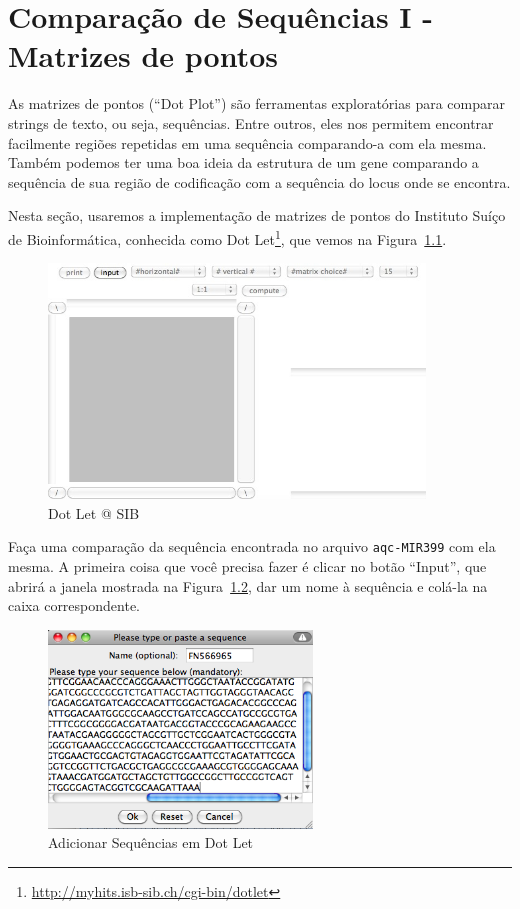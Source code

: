 \documentclass[letter,11pt]{book}
\begin{document}
\chapter{Comparação de Sequências I - Matrizes de pontos}

As matrizes de pontos (``Dot Plot'') são ferramentas exploratórias para comparar strings de texto, ou seja, sequências. Entre outros, eles nos permitem encontrar facilmente regiões repetidas em uma sequência comparando-a com ela mesma. Também podemos ter uma boa ideia da estrutura de um gene comparando a sequência de sua região de codificação com a sequência do locus onde se encontra.

Nesta seção, usaremos a implementação de matrizes de pontos do Instituto Suíço de Bioinformática, conhecida como Dot Let\footnote{\url{http://myhits.isb-sib.ch/cgi-bin/dotlet}}, que vemos na Figura~\ref{DotLet1}.

\begin{figure}[ht]
\centering
   \includegraphics[width=10cm]{Figs/DotLet1.png}
  \caption{\label{DotLet1}Dot Let @ SIB}
\end{figure}

Faça uma comparação da sequência encontrada no arquivo \Verb+aqc-MIR399+ com ela mesma. A primeira coisa que você precisa fazer é clicar no botão ``Input'', que abrirá a janela mostrada na Figura~\ref{inputDotLet}, dar um nome à sequência e colá-la na caixa correspondente.

\begin{figure}[ht]
\centering
   \includegraphics[width=7cm]{Figs/inputDotLet.png}
  \caption{\label{inputDotLet}Adicionar Sequências em Dot Let}
\end{figure}
\end{document}
